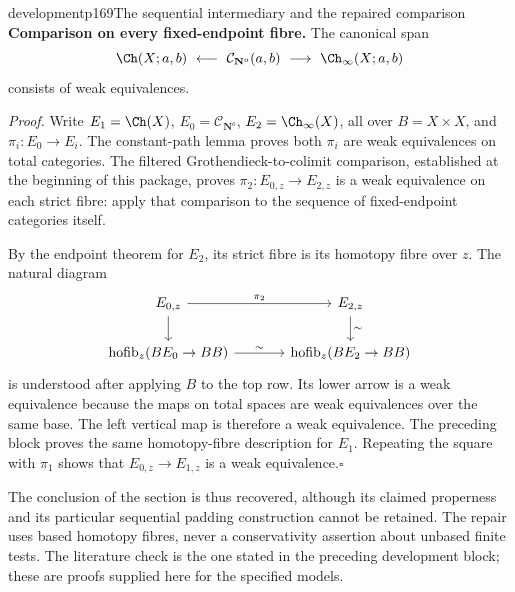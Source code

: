 \begin{dcomment}{development}{p169}{The sequential intermediary and the repaired comparison}
\textbf{Comparison on every fixed-endpoint fibre.}\ours\quad
The canonical span
\[
 \Ch(X;a,b)\ \longleftarrow\
 \mathcal C_{\mathbf N^o}(a,b)\ \longrightarrow\
 \Ch_\infty(X;a,b)
\]
consists of weak equivalences.

\emph{Proof.} Write $E_1=\Ch(X)$, $E_0=\mathcal C_{\mathbf N^o}$, $E_2=\Ch_\infty(X)$, all over $B=X\times X$, and $\pi_i:E_0\to E_i$. The constant-path lemma proves both $\pi_i$ are weak equivalences on total categories. The filtered Grothendieck-to-colimit comparison, established at the beginning of this package, proves $\pi_2:E_{0,z}\to E_{2,z}$ is a weak equivalence on each strict fibre: apply that comparison to the sequence of fixed-endpoint categories itself.

By the endpoint theorem for $E_2$, its strict fibre is its homotopy fibre over $z$. The natural diagram
\[
\begin{tikzcd}[column sep=large]
 E_{0,z}\arrow[r,"\pi_2"]\arrow[d] & E_{2,z}\arrow[d,"\sim"]\\
 \operatorname{hofib}_z(BE_0\to BB)\arrow[r,"\sim"] &
 \operatorname{hofib}_z(BE_2\to BB)
\end{tikzcd}
\]
is understood after applying $B$ to the top row. Its lower arrow is a weak equivalence because the maps on total spaces are weak equivalences over the same base. The left vertical map is therefore a weak equivalence. The preceding block proves the same homotopy-fibre description for $E_1$. Repeating the square with $\pi_1$ shows that $E_{0,z}\to E_{1,z}$ is a weak equivalence.\hfill$\square$

The conclusion of the section is thus recovered, although its claimed properness and its particular sequential padding construction cannot be retained. The repair uses based homotopy fibres, never a conservativity assertion about unbased finite tests. The literature check is the one stated in the preceding development block; these are proofs supplied here for the specified models.
\end{dcomment}

